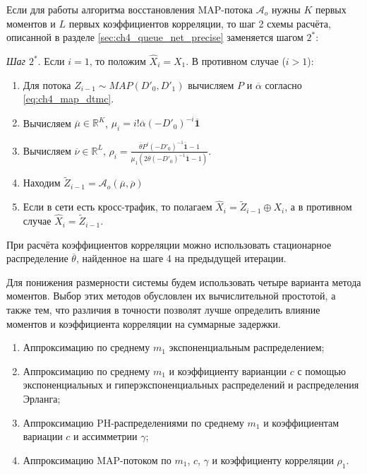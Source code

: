 Если для работы алгоритма восстановления MAP-потока $\mathcal{A}_o$ нужны $K$ первых моментов и $L$ первых коэффициентов корреляции, то шаг 2 схемы расчёта, описанной в разделе \ref{sec:ch4_queue_net_precise} заменяется шагом $2^*$:

\textit{Шаг $2^*$}. Если $i = 1$, то положим $\hat{X}_i = X_1$. В противном случае ($i > 1$):
\begin{enumerate}
\item Для потока $Z_{i-1} \sim MAP(D'_0, D'_1)$ вычисляем $P$ и $\overline\alpha$ согласно \eqref{eq:ch4_map_dtmc}.
\item Вычисляем $\overline\mu \in \mathbb{R}^{K}$, $\mu_i = i! \overline\alpha (-D'_0)^{-i} \overline{\mathbf{1}}$
\item Вычисляем $\overline\nu \in \mathbb{R}^{L}$, $\rho_i = \frac{\overline\theta P^i (-D'_0)^{-1} \overline{\mathbf{1}} - 1}{\mu_1 \left( 2 \overline\theta (-D'_0)^{-1} \overline{\mathbf{1}} - 1 \right)}$.
\item Находим $\tilde{Z}_{i-1} = \mathcal{A}_o(\overline\mu, \overline\rho)$
\item Если в сети есть кросс-трафик, то полагаем $\hat{X}_i = \tilde{Z}_{i-1} \oplus X_i$, а в противном случае $\hat{X}_i = \tilde{Z}_{i-1}$.
\end{enumerate}
При расчёта коэффициентов корреляции можно использовать стационарное распределение $\overline\theta$, найденное на шаге 4 на предыдущей итерации.

Для понижения размерности системы будем использовать четыре варианта метода моментов. Выбор этих методов обусловлен их вычислительной простотой, а также тем, что различия в точности позволят лучше определить влияние моментов и коэффициента корреляции на суммарные задержки.

\begin{enumerate}
\item Аппроксимацию по среднему $m_1$ экспоненциальным распределением;
\item Аппроксимацию по среднему $m_1$ и коэффициенту варианции $c$ с помощью экспоненциальных и гиперэкспоненциальных распределений и распределения Эрланга;
\item Аппроксимацию PH-распределениями по среднему $m_1$ и коэффициентам вариации $c$ и ассимметрии $\gamma$;
\item Аппроксимацию MAP-потоком по $m_1$, $c$, $\gamma$ и коэффициенту корреляции $\rho_1$.
\end{enumerate}

